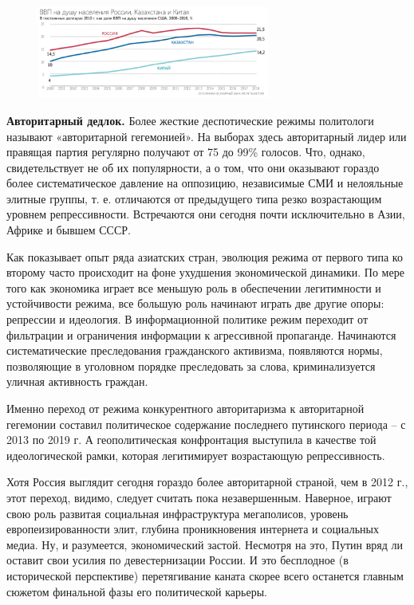 \begin{figure}
    \begin{center}
        \includegraphics[width=0.68\textwidth]{img/1tbz.png}
    \end{center}
\end{figure}
\textbf{Авторитарный дедлок.} Более жесткие деспотические режимы политологи называют «авторитарной гегемонией». На выборах здесь авторитарный лидер или правящая партия регулярно получают от 75 до 99\% голосов. Что, однако, свидетельствует не об их популярности, а о том, что они оказывают гораздо более систематическое давление на оппозицию, независимые СМИ и нелояльные элитные группы, т. е. отличаются от предыдущего типа резко возрастающим уровнем репрессивности. Встречаются они сегодня почти исключительно в Азии, Африке и бывшем СССР.

Как показывает опыт ряда азиатских стран, эволюция режима от первого типа ко второму часто происходит на фоне ухудшения экономической динамики. По мере того как экономика играет все меньшую роль в обеспечении легитимности и устойчивости режима, все большую роль начинают играть две другие опоры: репрессии и идеология. В информационной политике режим переходит от фильтрации и ограничения информации к агрессивной пропаганде. Начинаются систематические преследования гражданского активизма, появляются нормы, позволяющие в уголовном порядке преследовать за слова, криминализуется уличная активность граждан.

Именно переход от режима конкурентного авторитаризма к авторитарной гегемонии составил политическое содержание последнего путинского периода – с 2013 по 2019 г. А геополитическая конфронтация выступила в качестве той идеологической рамки, которая легитимирует возрастающую репрессивность.

Хотя Россия выглядит сегодня гораздо более авторитарной страной, чем в 2012 г., этот переход, видимо, следует считать пока незавершенным. Наверное, играют свою роль развитая социальная инфраструктура мегаполисов, уровень европеизированности элит, глубина проникновения интернета и социальных медиа. Ну, и разумеется, экономический застой. Несмотря на это, Путин вряд ли оставит свои усилия по девестернизации России. И это бесплодное (в исторической перспективе) перетягивание каната скорее всего останется главным сюжетом финальной фазы его политической карьеры.


